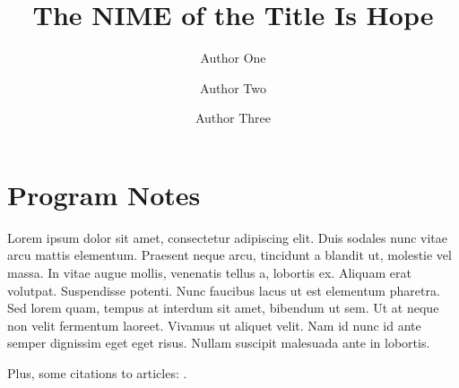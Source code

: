 \documentclass[acmsmall]{nimeart}
\begin{document}
\title{The NIME of the Title Is Hope}

\author{Author One}

\author{Author Two}

\author{Author Three}

\renewcommand{\shortauthors}{Trovato et al.}


\maketitle

\section{Program Notes}

Lorem ipsum dolor sit amet, consectetur adipiscing elit. Duis sodales nunc vitae arcu mattis elementum. Praesent neque arcu, tincidunt a blandit ut, molestie vel massa. In vitae augue mollis, venenatis tellus a, lobortis ex. Aliquam erat volutpat. Suspendisse potenti. Nunc faucibus lacus ut est elementum pharetra. Sed lorem quam, tempus at interdum sit amet, bibendum ut sem. Ut at neque non velit fermentum laoreet. Vivamus ut aliquet velit. Nam id nunc id ante semper dignissim eget eget risus. Nullam suscipit malesuada ante in lobortis.

Plus, some citations to articles: \cite{doe2023,
wizard2022, alien2024}.
\end{document}
